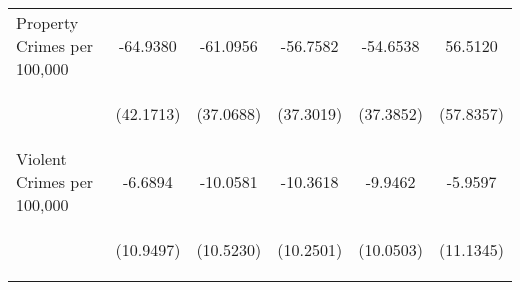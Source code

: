 \begin{center}
\begin{tabular}{lccccc}
\noalign{\smallskip}Property Crimes per 100,000 & \begin{scriptsize}-64.9380\end{scriptsize} & \begin{scriptsize}-61.0956\end{scriptsize} & \begin{scriptsize}-56.7582\end{scriptsize} & \begin{scriptsize}-54.6538\end{scriptsize} & \begin{scriptsize}56.5120\end{scriptsize}\\
 & \begin{scriptsize}(42.1713)\end{scriptsize} & \begin{scriptsize}(37.0688)\end{scriptsize} & \begin{scriptsize}(37.3019)\end{scriptsize} & \begin{scriptsize}(37.3852)\end{scriptsize} & \begin{scriptsize}(57.8357)\end{scriptsize}\\
\noalign{\smallskip}Violent Crimes per 100,000 & \begin{scriptsize}-6.6894\end{scriptsize} & \begin{scriptsize}-10.0581\end{scriptsize} & \begin{scriptsize}-10.3618\end{scriptsize} & \begin{scriptsize}-9.9462\end{scriptsize} & \begin{scriptsize}-5.9597\end{scriptsize}\\
 & \begin{scriptsize}(10.9497)\end{scriptsize} & \begin{scriptsize}(10.5230)\end{scriptsize} & \begin{scriptsize}(10.2501)\end{scriptsize} & \begin{scriptsize}(10.0503)\end{scriptsize} & \begin{scriptsize}(11.1345)\end{scriptsize}\\

\end{tabular}
\end{center}
